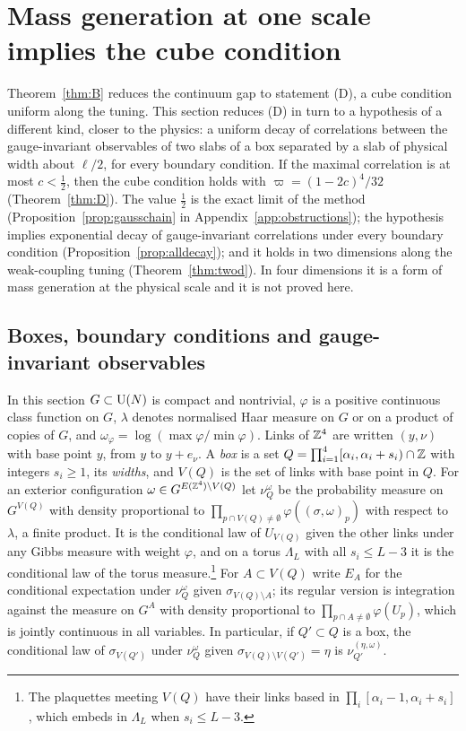 \section{Mass generation at one scale implies the cube condition}\label{sec:massgen}

Theorem~\ref{thm:B} reduces the continuum gap to statement (D), a cube
condition uniform along the tuning. This section reduces (D) in turn to a
hypothesis of a different kind, closer to the physics: a uniform decay of
correlations between the gauge-invariant observables of two slabs of a box
separated by a slab of physical width about $\ell/2$, for every boundary
condition. If the maximal correlation is at most $c<\frac12$, then the cube
condition holds with $\varpi=(1-2c)^4/32$ (Theorem~\ref{thm:D}). The value
$\frac12$ is the exact limit of the method (Proposition~\ref{prop:gausschain}
in Appendix~\ref{app:obstructions}); the hypothesis implies exponential decay
of gauge-invariant correlations under every boundary condition
(Proposition~\ref{prop:alldecay}); and it holds in two dimensions along the
weak-coupling tuning (Theorem~\ref{thm:twod}). In four dimensions it is a
form of mass generation at the physical scale and it is not proved here.

\subsection{Boxes, boundary conditions and gauge-invariant observables}

In this section $G\subset\mathrm{U}(N)$ is compact and nontrivial, $\varphi$ is a
positive continuous class function on $G$, $\lambda$ denotes normalised Haar
measure on $G$ or on a product of copies of $G$, and
$\omega_\varphi=\log(\max\varphi/\min\varphi)$. Links of $\mathbb{Z}^4$ are written
$(y,\nu)$ with base point $y$, from $y$ to $y+e_\nu$. A \emph{box} is a set
$Q=\prod_{i=1}^4[\alpha_i,\alpha_i+s_i)\cap\mathbb{Z}$ with integers $s_i\ge1$, its
\emph{widths}, and $V(Q)$ is the set of links with base point in $Q$. For an
exterior configuration $\omega\in G^{E(\mathbb{Z}^4)\setminus V(Q)}$ let
$\nu^\omega_Q$ be the probability measure on $G^{V(Q)}$ with density
proportional to $\prod_{p\cap V(Q)\ne\emptyset}\varphi((\sigma,\omega)_p)$
with respect to $\lambda$, a finite product. It is the conditional law of
$U_{V(Q)}$ given the other links under any Gibbs measure with weight
$\varphi$, and on a torus $\Lambda_L$ with all $s_i\le L-3$ it is the
conditional law of the torus measure.\footnote{The plaquettes meeting $V(Q)$
have their links based in $\prod_i[\alpha_i-1,\alpha_i+s_i]$, which embeds in
$\Lambda_L$ when $s_i\le L-3$.} For $A\subset V(Q)$ write $E_A$ for the
conditional expectation under $\nu^\omega_Q$ given $\sigma_{V(Q)\setminus A}$;
its regular version is integration against the measure on $G^A$ with density
proportional to $\prod_{p\cap A\ne\emptyset}\varphi(U_p)$, which is jointly
continuous in all variables. In particular, if $Q'\subset Q$ is a box, the
conditional law of $\sigma_{V(Q')}$ under $\nu^\omega_Q$ given
$\sigma_{V(Q)\setminus V(Q')}=\eta$ is $\nu^{(\eta,\omega)}_{Q'}$.

